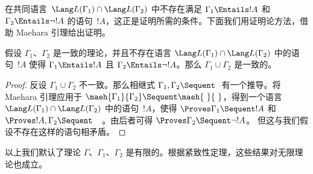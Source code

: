 \documentclass[../../../include/open-logic-section]{subfiles}
\begin{document}
在共同语言~$\Lang L(\Gamma_1) \cap \Lang L(\Gamma_2)$ 中不存在满足 $\Gamma_1
\Entails !A$ 和 $\Gamma_2 \Entails \lnot !A$ 的语句~$!A$，这正是证明所需的条件。下面我们用证明论方法，借助 Maehara 引理给出证明。

\begin{thm}
假设 $\Gamma_1$、$\Gamma_2$ 是一致的理论，并且不存在语言 $\Lang L(\Gamma_1) \cap \Lang L(\Gamma_2)$ 中的语句~$!A$ 使得 $\Gamma_1 \Entails !A$ 且 $\Gamma_2 \Entails \lnot !A$。那么 $\Gamma_1 \cup \Gamma_2$ 是一致的。
\end{thm}

\begin{proof}
  反设 $\Gamma_1 \cup \Gamma_2$ 不一致。那么相继式 $\Gamma_1, \Gamma_2 \Sequent \ $ 有一个推导。将 Maehara 引理应用于 $\maeh{\Gamma_1}{\Gamma_2}
  \Sequent \maeh{\ }{\ }$，得到一个语言~$\Lang L(\Gamma_1) \cap \Lang L(\Gamma_2)$ 中的语句~$!A$，使得
  $\Proves \Gamma_1 \Sequent !A$ 和 $\Proves !A, \Gamma_2 \Sequent
  \quad$。由后者可得 $\Proves \Gamma_2 \Sequent \lnot !A$。
  但这与我们假设不存在这样的语句相矛盾。
\end{proof}

以上我们默认了理论 $\Gamma$、$\Gamma_1$、$\Gamma_2$ 是有限的。根据紧致性定理，这些结果对无限理论也成立。
\end{document}
